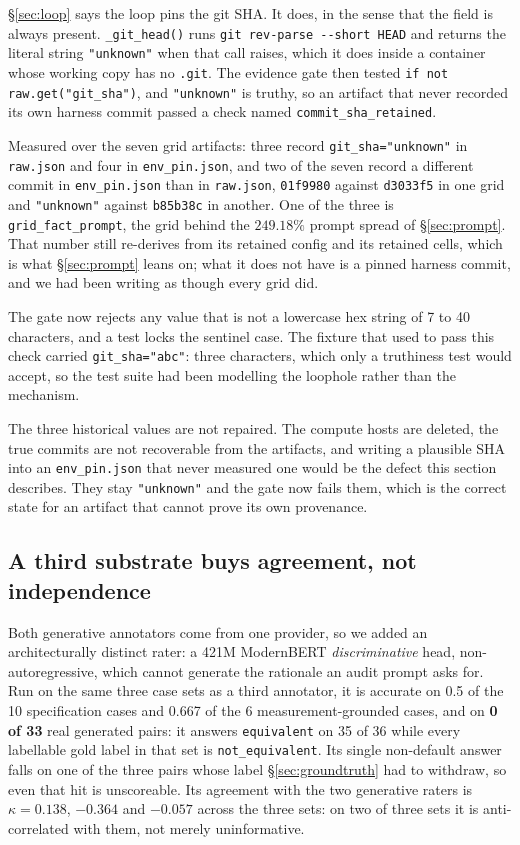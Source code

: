 \documentclass[10pt,twocolumn]{article}
\begin{document}
\S\ref{sec:loop} says the loop pins the git SHA. It does, in the sense that the field is
always present. \texttt{\_git\_head()} runs \texttt{git rev-parse -{}-short HEAD} and
returns the literal string \texttt{"unknown"} when that call raises, which it does inside
a container whose working copy has no \texttt{.git}. The evidence gate then tested
\texttt{if not raw.get("git\_sha")}, and \texttt{"unknown"} is truthy, so an artifact
that never recorded its own harness commit passed a check named
\texttt{commit\_sha\_retained}.

Measured over the seven grid artifacts: three record \texttt{git\_sha="unknown"} in
\texttt{raw.json} and four in \texttt{env\_pin.json}, and two of the seven record a
different commit in \texttt{env\_pin.json} than in \texttt{raw.json}, \texttt{01f9980}
against \texttt{d3033f5} in one grid and \texttt{"unknown"} against \texttt{b85b38c} in
another. One of the three is \texttt{grid\_fact\_prompt}, the grid behind the
$249.18\%$ prompt spread of \S\ref{sec:prompt}. That number still re-derives from its
retained config and its retained cells, which is what \S\ref{sec:prompt} leans on; what
it does not have is a pinned harness commit, and we had been writing as though every grid
did.

The gate now rejects any value that is not a lowercase hex string of 7 to 40 characters,
and a test locks the sentinel case. The fixture that used to pass this check carried
\texttt{git\_sha="abc"}: three characters, which only a truthiness test would accept, so
the test suite had been modelling the loophole rather than the mechanism.

The three historical values are not repaired. The compute hosts are deleted, the true
commits are not recoverable from the artifacts, and writing a plausible SHA into an
\texttt{env\_pin.json} that never measured one would be the defect this section
describes. They stay \texttt{"unknown"} and the gate now fails them, which is the correct
state for an artifact that cannot prove its own provenance.

\subsection{A third substrate buys agreement, not independence}
\label{sec:substrate}

Both generative annotators come from one provider, so we added an architecturally
distinct rater: a 421M ModernBERT \emph{discriminative} head, non-autoregressive,
which cannot generate the rationale an audit prompt asks for. Run on the same three
case sets as a third annotator, it is accurate on 0.5 of the 10 specification cases
and 0.667 of the 6 measurement-grounded cases, and on \textbf{0 of 33} real generated
pairs: it answers \texttt{equivalent} on 35 of 36 while every labellable gold label
in that set is \texttt{not\_equivalent}. Its single non-default answer falls on one
of the three pairs whose label \S\ref{sec:groundtruth} had to withdraw, so even that
hit is unscoreable. Its agreement with the two generative raters is
$\kappa=0.138$, $\mathbf{-0.364}$ and $-0.057$ across the three sets: on two of
three sets it is anti-correlated with them, not merely uninformative.
\end{document}
